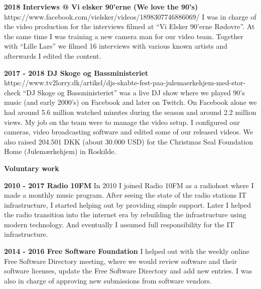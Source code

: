 \documentclass[11pt]{article}
\begin{document}
\textbf{2018      Interviews @ Vi elsker 90'erne (We love the 90’s)}\newline
\textcolor{mygreen}{https://www.facebook.com/vielsker/videos/1898307746886069/}\newline
I was in charge of the video production for the interviews filmed at “Vi Elsker 90'erne Rødovre”. At the same
time I was training a new camera man for our video team. Together with “Lille Lars” we filmed 16 interviews with
various known artists and afterwards I edited the content.\newline

\textbf{2017 - 2018   DJ Skoge og Bassministeriet}\newline
\textcolor{mygreen}{https://www.tv2lorry.dk/artikel/djs-skabte-fest-paa-julemaerkehjem-med-stor-check}\newline
“DJ Skoge og Bassministeriet” was a live DJ show where we played 90's music (and early 2000's) on Facebook and
later on Twitch. On Facebook alone we had around 5.6 million watched minutes during the season and around 2.2
million views. My job on the team were to manage the video setup. I configured our cameras, video broadcasting
software and edited some of our released videos. We also raised 204.501 DKK (about 30.000 USD) for the Christmas
Seal Foundation Home (Julemærkehjem) in Roskilde.\newline

\textcolor{mygreen}{{\fontsize{13}{16}\textbf{{Voluntary work}}}}\newline

\textbf{2010 - 2017   Radio 10FM}\newline
In 2010 I joined Radio 10FM as a radiohost where I made a monthly music program. After seeing the state of the
radio stations IT infrastructure, I started helping out by providing simple support. Later I helped the radio
transition into the internet era by rebuilding the infrastructure using modern technology. And eventually I
assumed full responsibility for the IT infrastructure.\newline

\textbf{2014 - 2016   Free Software Foundation}\newline
I helped out with the weekly online Free Software Directory meeting, where we would review software and their
software licenses, update the Free Software Directory and add new entries. I was also in charge of approving new
submissions from software vendors.\newline
\end{document}
